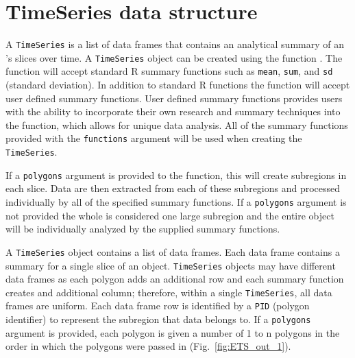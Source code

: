 \documentclass[11pt]{report}
\begin{document}
\section{TimeSeries data structure}
\label{sub:timeseries}

A \lstinline{TimeSeries} is a list of data frames that contains an analytical summary of an 's slices over time.
A \lstinline{TimeSeries} object can be created using the function .
The  function will accept standard R summary functions such as \lstinline{mean}, \lstinline{sum}, and \lstinline{sd} (standard deviation).
In addition to standard R functions the  function will accept user defined summary functions.
User defined summary functions provides users with the ability to incorporate their own research and summary techniques into the  function, which allows for unique data analysis.
All of the summary functions provided with the \lstinline{functions} argument will be used when creating the \lstinline{TimeSeries}.

If a \lstinline{polygons} argument is provided to the  function, this will create subregions in each  slice.
Data are then extracted from each of these subregions and processed individually by all of the specified summary functions.
If a \lstinline{polygons} argument is not provided the whole  is considered one large subregion and the entire object will be individually analyzed by the supplied summary functions.

A \lstinline{TimeSeries} object contains a list of data frames.
Each data frame contains a summary for a single slice of an  object.
\lstinline{TimeSeries} objects may have different data frames as each polygon adds an additional row and each summary function creates and additional column; therefore, within a single \lstinline{TimeSeries}, all data frames are uniform.
Each data frame row is identified by a \lstinline{PID} (polygon identifier) to represent the subregion that data belongs to.
If a \lstinline{polygons} argument is provided, each polygon is given a number of 1 to n polygons in the order in which the polygons were passed in (Fig.~\ref{fig:ETS_out_1}).
\end{document}
